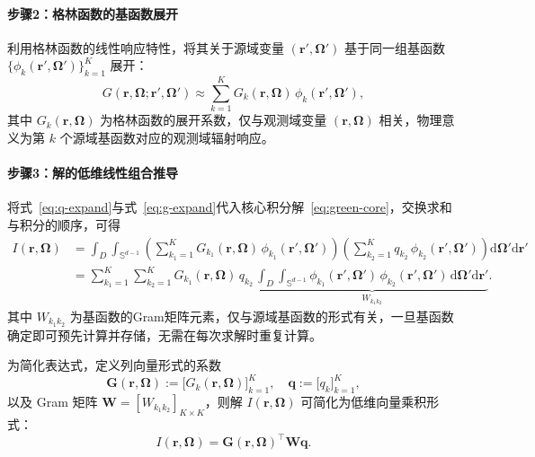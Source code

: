 \paragraph{步骤2：格林函数的基函数展开}
利用格林函数的线性响应特性，将其关于源域变量 $(\boldsymbol{r}',\boldsymbol{\Omega}')$ 基于同一组基函数 $\{\phi_k(\boldsymbol{r}',\boldsymbol{\Omega}')\}_{k=1}^K$ 展开：
\begin{equation}\label{eq:g-expand}
    G(\boldsymbol{r},\boldsymbol{\Omega};\boldsymbol{r}',\boldsymbol{\Omega}') \approx \sum_{k=1}^{K} G_k(\boldsymbol{r},\boldsymbol{\Omega})\, \phi_k(\boldsymbol{r}',\boldsymbol{\Omega}'),
\end{equation}
其中 $G_k(\boldsymbol{r},\boldsymbol{\Omega})$ 为格林函数的展开系数，仅与观测域变量 $(\boldsymbol{r},\boldsymbol{\Omega})$ 相关，物理意义为第 $k$ 个源域基函数对应的观测域辐射响应。

\paragraph{步骤3：解的低维线性组合推导}
将式~\eqref{eq:q-expand}与式~\eqref{eq:g-expand}代入核心积分解~\eqref{eq:green-core}，交换求和与积分的顺序，可得
\begin{equation}
    \begin{aligned}
        I(\boldsymbol{r},\boldsymbol{\Omega})
         & = \int_{D}\int_{\mathbb{S}^{d-1}} \left(\sum_{k_1=1}^{K} G_{k_1}(\boldsymbol{r},\boldsymbol{\Omega})\, \phi_{k_1}(\boldsymbol{r}',\boldsymbol{\Omega}')\right)
        \left(\sum_{k_2=1}^{K} q_{k_2}\, \phi_{k_2}(\boldsymbol{r}',\boldsymbol{\Omega}')\right)\mathrm{d}\boldsymbol{\Omega}'\mathrm{d}\boldsymbol{r}'                                                                                                                                                                         \\
         & = \sum_{k_1=1}^{K}\sum_{k_2=1}^{K} G_{k_1}(\boldsymbol{r},\boldsymbol{\Omega})\, q_{k_2}\, \underbrace{\int_{D}\int_{\mathbb{S}^{d-1}} \phi_{k_1}(\boldsymbol{r}',\boldsymbol{\Omega}')\, \phi_{k_2}(\boldsymbol{r}',\boldsymbol{\Omega}')\, \mathrm{d}\boldsymbol{\Omega}'\mathrm{d}\boldsymbol{r}'}_{W_{k_1 k_2}}.
    \end{aligned}
\end{equation}
其中 $W_{k_1 k_2}$ 为基函数的Gram矩阵元素，仅与源域基函数的形式有关，一旦基函数确定即可预先计算并存储，无需在每次求解时重复计算。

为简化表达式，定义列向量形式的系数
\begin{equation}
    \boldsymbol{G}(\boldsymbol{r},\boldsymbol{\Omega}):=\bigl[G_k(\boldsymbol{r},\boldsymbol{\Omega})\bigr]_{k=1}^{K}, \quad
    \boldsymbol{q}:=\bigl[q_k\bigr]_{k=1}^{K},
\end{equation}
以及 Gram 矩阵 $\boldsymbol{W} = [W_{k_1 k_2}]_{K\times K}$，则解 $I(\boldsymbol{r},\boldsymbol{\Omega})$ 可简化为低维向量乘积形式：
\begin{equation}\label{eq:i-vector}
    I(\boldsymbol{r},\boldsymbol{\Omega}) = \boldsymbol{G}(\boldsymbol{r},\boldsymbol{\Omega})^{\top} \boldsymbol{W} \boldsymbol{q}.
\end{equation}

